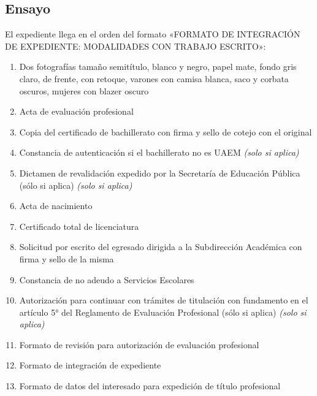 \subsection{Ensayo}
El expediente llega en el orden del formato «FORMATO DE INTEGRACIÓN DE EXPEDIENTE: MODALIDADES CON TRABAJO ESCRITO»:
\begin{enumerate}
  \item Dos fotografías tamaño semitítulo, blanco y negro, papel mate, fondo gris claro, de frente, con retoque, varones con camisa blanca, saco y corbata oscuros, mujeres con blazer oscuro
  \item Acta de evaluación profesional
  \item Copia del certificado de bachillerato con firma y sello de cotejo con el original
  \item Constancia de autenticación si el bachillerato no es UAEM \emph{(solo si aplica)}
  \item Dictamen de revalidación expedido por la Secretaría de Educación Pública (sólo si aplica) \emph{(solo si aplica)}
  \item Acta de nacimiento
  \item Certificado total de licenciatura
  \item Solicitud por escrito del egresado dirigida a la Subdirección Académica con firma y sello de la misma
  \item Constancia de no adeudo a Servicios Escolares
  \item Autorización para continuar con trámites de titulación con fundamento en el artículo 5° del Reglamento de Evaluación Profesional (sólo si aplica) \emph{(solo si aplica)}
  \item Formato de revisión para autorización de evaluación profesional
  \item Formato de integración de expediente
  \item Formato de datos del interesado para expedición de título profesional
\end{enumerate}
